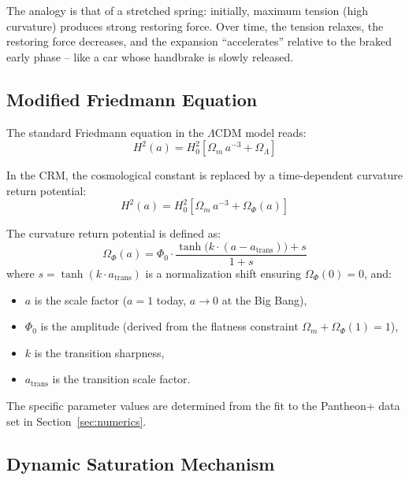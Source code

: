 \documentclass[aps,prd,twocolumn,superscriptaddress,nofootinbib]{revtex4-2}
\begin{document}
The analogy is that of a stretched spring: initially, maximum tension (high curvature) produces strong restoring force. Over time, the tension relaxes, the restoring force decreases, and the expansion ``accelerates'' relative to the braked early phase -- like a car whose handbrake is slowly released.


\subsection{Modified Friedmann Equation}
\label{subsec:friedmann}

The standard Friedmann equation in the $\Lambda$CDM model reads:
\begin{equation}
H^2(a) = H_0^2 \left[\Omega_m\,a^{-3} + \Omega_\Lambda\right]
\label{eq:friedmann_lcdm}
\end{equation}

In the CRM, the cosmological constant is replaced by a time-dependent curvature return potential:
\begin{equation}
H^2(a) = H_0^2 \left[\Omega_m\,a^{-3} + \Omega_\Phi(a)\right]
\label{eq:friedmann_cfm}
\end{equation}

The curvature return potential is defined as:
\begin{equation}
\Omega_\Phi(a) = \Phi_0 \cdot \frac{\tanh\!\big(k\cdot(a - a_{\mathrm{trans}})\big) + s}{1 + s}
\label{eq:potential_cfm}
\end{equation}
where $s = \tanh(k \cdot a_{\mathrm{trans}})$ is a normalization shift ensuring $\Omega_\Phi(0) = 0$, and:
\begin{itemize}
\item $a$ is the scale factor ($a=1$ today, $a \to 0$ at the Big Bang),
\item $\Phi_0$ is the amplitude (derived from the flatness constraint $\Omega_m + \Omega_\Phi(1) = 1$),
\item $k$ is the transition sharpness,
\item $a_{\mathrm{trans}}$ is the transition scale factor.
\end{itemize}
The specific parameter values are determined from the fit to the Pantheon+ data set in Section~\ref{sec:numerics}.

\subsection{Dynamic Saturation Mechanism}
\label{subsec:saturation}
\end{document}
